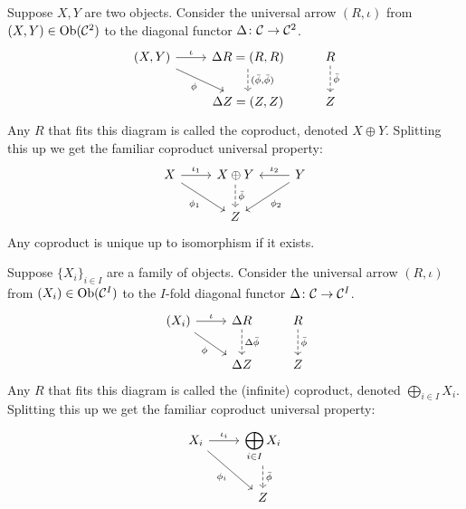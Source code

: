 \begin{definition}
    Suppose \(X,Y\) are two objects.
    Consider the universal arrow \((R,\iota)\) from \((X,Y) \in \operatorname{Ob}(\mathcal{C}^2)\)
    to the diagonal functor \(\Delta\colon\mathcal{C}\to\mathcal{C}^2\).
    \begin{equation*}
        \begin{tikzcd}
            (X,Y) \arrow{r}{\iota} \arrow{rd}[swap]{\phi} &
            \Delta R = (R,R) \arrow[dashrightarrow]{d}{(\bar{\phi},\bar{\phi})} &
            R \arrow[dashrightarrow]{d}{\bar{\phi}} \\
            & \Delta Z = (Z,Z) & Z
        \end{tikzcd}
    \end{equation*}
    Any \(R\) that fits this diagram is called the coproduct, denoted \(X \oplus Y\).
    Splitting this up we get the familiar coproduct universal property:
    \begin{equation*}
        \begin{tikzcd}
            X \arrow{r}{\iota_1} \arrow{rd}[swap]{\phi_1} &
            X \oplus Y \arrow[dashrightarrow]{d}{\bar{\phi}} &
            Y \arrow{l}[swap]{\iota_2} \arrow{ld}{\phi_2} \\
            & Z
        \end{tikzcd}
    \end{equation*}
    Any coproduct is unique up to isomorphism if it exists.
\end{definition}
\begin{definition}
    Suppose \({\{X_i\}}_{i \in I}\) are a family of objects.
    Consider the universal arrow \((R,\iota)\) from \((X_i) \in \operatorname{Ob}(\mathcal{C}^I)\)
    to the \(I\)-fold diagonal functor \(\Delta\colon\mathcal{C}\to\mathcal{C}^I\).
    \begin{equation*}
        \begin{tikzcd}
            (X_i) \arrow{r}{\iota} \arrow{rd}[swap]{\phi} &
            \Delta R \arrow[dashrightarrow]{d}{\Delta\bar{\phi}} &
            R \arrow[dashrightarrow]{d}{\bar{\phi}} \\
            & \Delta Z & Z
        \end{tikzcd}
    \end{equation*}
    Any \(R\) that fits this diagram is called the (infinite) coproduct, denoted \(\bigoplus_{i \in I} X_i\).
    Splitting this up we get the familiar coproduct universal property:
    \begin{equation*}
        \begin{tikzcd}
            X_i \arrow{r}{\iota_i} \arrow{rd}[swap]{\phi_i} &
            \displaystyle\bigoplus_{i \in I} X_i \arrow[dashrightarrow]{d}{\bar{\phi}} \\
            & Z
        \end{tikzcd}
    \end{equation*}
\end{definition}
